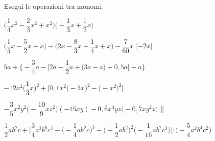 \begin{esercizio}[\Ast]
 \label{ese:9.34}
Esegui le operazioni tra monomi.

\begin{enumeratea}
 \item 
$\bigg(\dfrac{1}{4}x^{2}-\dfrac{2}{3}x^{2}+x^{2}\bigg)\bigg(-{\dfrac{1}{3}}
x+\dfrac{1}{2}x\bigg)$
  \hfill{}
 \item 
$\bigg(\dfrac{1}{5}x-\dfrac{5}{2}x+x\bigg)-\bigg(2x-\dfrac{8}{3}x+\dfrac{1}{4}
x+x\bigg)-\dfrac{7}{60}x$
  \hfill[$-2x$]
 \item 
$5a+\Bigg\{-{\dfrac{3}{4}}a-\bigg[2a-\dfrac{1}{2}a+\big(3a-a\big)+0,5a\bigg]
-a\Bigg\}$
  \hfill{}
 \item 
$-12x^{2}\bigg(\dfrac{1}{3}x\bigg)^{2}+\bigg[0,1x^{2}\big(-5x\big)^{2}-\big(-x^{
2}\big)^{2}\bigg]$
  \hfill{}
 \item 
$-{\dfrac{3}{5}}x^{2}y^{2}\bigg(-{\dfrac{10}{9}}xz^{2}\bigg)(-15xy)-0,\overline{
6}x^{4}yz\big(-0,\overline{7}xy^{2}z\big)$
  \hfill[]
 \item 
$\dfrac{1}{2}ab^{2}c+\Bigg[\dfrac{3}{4}a^{3}b^{6}c^{3}-\bigg(-{\dfrac{1}{4}ab^{2
}c}\bigg)^{3}-\bigg(-{\dfrac{1}{2}ab^{2}}\bigg)^{2}\bigg(-{\dfrac{1}{16}ab^{2}c^
{3}}\bigg)\Bigg]:%
 \bigg(-{\dfrac{5}{4}a^{2}b^{4}c^{2}}\bigg)$
  \hfill{}
\end{enumeratea}
\end{esercizio}

